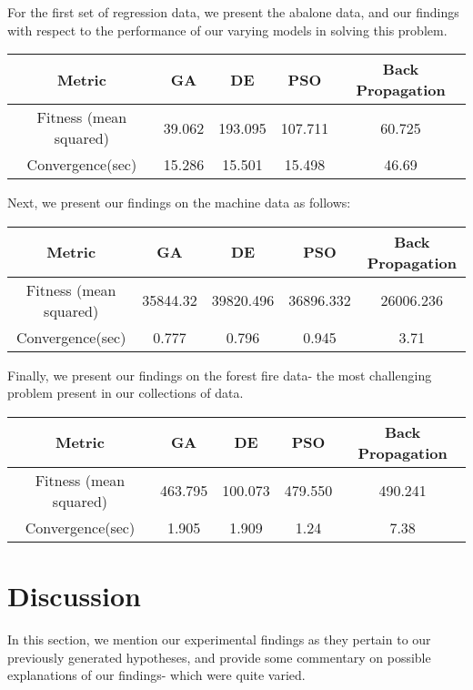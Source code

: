 \documentclass[twoside,11pt]{article}
\begin{document}
For the first set of regression data, we present the abalone data, and our findings with
respect to the performance of our varying models in solving this problem.
\begin{center}
	\begin{tabular}{|c c c c c|}
		\hline
		Metric & GA & DE & PSO & Back Propagation \\ [0.5ex]
		\hline \hline
		Fitness (mean squared)  & 39.062 & 193.095 & 107.711 & 60.725 \\
		\hline
		Convergence(sec) & 15.286 & 15.501 & 15.498 & 46.69\\
		\hline
	\end{tabular}
\end{center}

Next, we present our findings on the machine data as follows:
\begin{center}
	\begin{tabular}{|c c c c c|}
		\hline
		Metric & GA & DE & PSO & Back Propagation \\ [0.5ex]
		\hline \hline
		Fitness (mean squared)  & 35844.32 & 39820.496 & 36896.332 & 26006.236 \\
		\hline
		Convergence(sec) & 0.777 & 0.796 & 0.945 & 3.71\\
		\hline
	\end{tabular}
\end{center}

Finally, we present our findings on the forest fire data- the most challenging problem present
in our collections of data.
\begin{center}
	\begin{tabular}{|c c c c c|}
		\hline
		Metric & GA & DE & PSO & Back Propagation \\ [0.5ex]
		\hline \hline
		Fitness (mean squared)  & 463.795 & 100.073 & 479.550 & 490.241 \\
		\hline
		Convergence(sec) & 1.905 & 1.909 & 1.24 & 7.38\\
		\hline
	\end{tabular}
\end{center}

\section{Discussion}
In this section, we mention our experimental findings as they pertain to our previously generated hypotheses,
and provide some commentary on possible explanations of our findings- which were quite varied.
\end{document}
